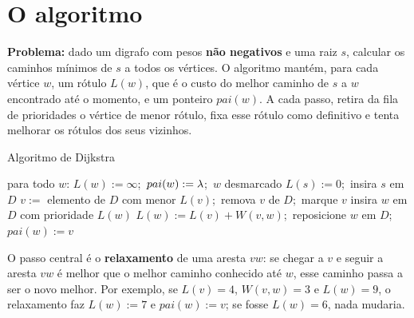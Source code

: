 \section{O algoritmo}\label{sec:dijalg}
\textbf{Problema:} dado um digrafo com pesos \textbf{não negativos} e uma raiz $s$, calcular os caminhos mínimos de $s$ a todos os vértices. O algoritmo mantém, para cada vértice $w$, um rótulo $L(w)$, que é o custo do melhor caminho de $s$ a $w$ encontrado até o momento, e um ponteiro $pai(w)$. A cada passo, retira da fila de prioridades o vértice de menor rótulo, fixa esse rótulo como definitivo e tenta melhorar os rótulos dos seus vizinhos.
\begin{pseudo}{Algoritmo de Dijkstra}
\begin{algorithmic}
  \State para todo $w$: $L(w):=\infty$;\ $pai(w):=\lambda$;\ $w$ desmarcado
  \State $L(s):=0$;\ insira $s$ em $D$
    \State $v:=$ elemento de $D$ com menor $L(v)$;\ remova $v$ de $D$;\ marque $v$ 
       \State insira $w$ em $D$ com prioridade $L(w)$ \EndIf
       
        \State $L(w):=L(v)+W(v,w)$;\ reposicione $w$ em $D$;\ $pai(w):=v$
      \EndIf
    \EndFor
  \EndWhile
\EndProcedure
\end{algorithmic}
\end{pseudo}
O passo central é o \textbf{relaxamento} de uma aresta $vw$: se chegar a $v$ e seguir a aresta $vw$ é melhor que o melhor caminho conhecido até $w$, esse caminho passa a ser o novo melhor. Por exemplo, se $L(v)=4$, $W(v,w)=3$ e $L(w)=9$, o relaxamento faz $L(w):=7$ e $pai(w):=v$; se fosse $L(w)=6$, nada mudaria.

